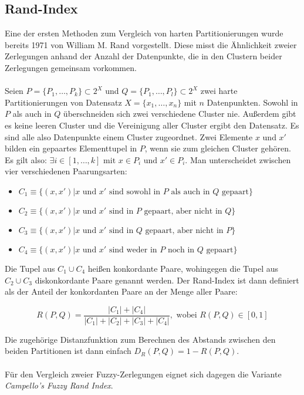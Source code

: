 \documentclass[11pt,ceqn]{book}
\begin{document}
\subsection{Rand-Index}
Eine der ersten Methoden zum Vergleich von harten Partitionierungen wurde bereits 1971 von William M. Rand \cite{rand} vorgestellt. Diese misst die Ähnlichkeit zweier Zerlegungen anhand der Anzahl der Datenpunkte, die in den Clustern beider Zerlegungen gemeinsam vorkommen. \\~\\
Seien $P = \{P_1, \dots, P_k\} \subset 2^X$ und  $Q = \{P_1, \dots, P_l\} \subset 2^X$ zwei harte Partitionierungen von Datensatz $X=\{x_1,\dots,x_n\}$ mit $n$ Datenpunkten. Sowohl in $P$ als auch in $Q$ überschneiden sich zwei verschiedene Cluster nie. Außerdem gibt es keine leeren Cluster und die Vereinigung aller Cluster ergibt den Datensatz. Es sind alle also Datenpunkte einem Cluster zugeordnet. Zwei Elemente $x$ und $x'$ bilden ein gepaartes Elementtupel in $P$, wenn sie zum gleichen Cluster gehören. Es gilt also: $\exists i \in \left[1,\dots,k\right] \text{ mit } x \in P_i \text{ und } x' \in P_i$. Man unterscheidet zwischen vier verschiedenen Paarungsarten:

\begin{itemize}
\item $C_1 \equiv \{(x,x')|  x \text{ und } x' \text{ sind sowohl in } P \text{ als auch in } Q \text{ gepaart}\}$
\item $C_2 \equiv \{(x,x')|  x \text{ und } x' \text{ sind in } P \text{ gepaart, aber nicht in } Q\}$
\item $C_3 \equiv \{(x,x')| x \text{ und } x' \text{ sind in } Q \text{ gepaart, aber nicht in } P\}$
\item $C_4 \equiv \{(x,x')|  x \text{ und } x' \text{ sind weder in } P \text{ noch in } Q \text{ gepaart}\}$
\end{itemize}

Die Tupel aus $C_1 \cup C_4$ heißen konkordante Paare, wohingegen die Tupel aus $C_2 \cup C_3$ diskonkordante Paare genannt werden. Der Rand-Index ist dann definiert als der Anteil der konkordanten Paare an der Menge aller Paare:

$$R(P,Q) = \frac{|C_1|+|C_4|}{|C_1|+|C_2|+|C_3|+|C_4|}, \text{ wobei } R(P,Q) \in \left[0,1 \right]$$

Die zugehörige Distanzfunktion zum Berechnen des Abstands zwischen den beiden Partitionen ist dann einfach $D_R(P,Q) = 1-R(P,Q)$.
\\~\\
Für den Vergleich zweier Fuzzy-Zerlegungen eignet sich dagegen die Variante \textit{Campello's Fuzzy Rand Index}.
\end{document}
